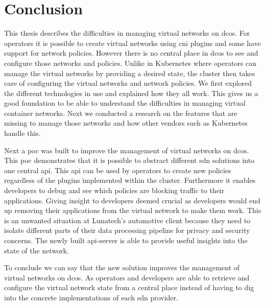 \chapter{Conclusion}
\label{chap:conclusions}
This thesis describes the difficulties in managing virtual networks on \gls{dcos}. For operators it is possible to create virtual networks using \gls{cni} plugins and some have support for network policies. However there is no central place in \gls{dcos} to see and configure those networks and policies. Unlike in Kubernetes where operators can manage the virtual networks by providing a desired state, the cluster then takes care of configuring the virtual networks and network policies. We first explored the different technologies in use and explained how they all work. This gives us a good foundation to be able to understand the difficulties in managing virtual container networks. Next we conducted a research on the features that are missing to manage those networks and how other vendors such as Kubernetes handle this.

Next a \gls{poc} was built to improve the management of virtual networks on \gls{dcos}. This \gls{poc} demonstrates that it is possible to abstract different \gls{sdn} solutions into one central \gls{api}. This \gls{api} can be used by operators to create new policies regardless of the plugins implemented within the cluster. Furthermore it enables developers to debug and see which policies are blocking traffic to their applications. Giving insight to developers deemed crucial as developers would end up removing their applications from the virtual network to make them work. This is an unwanted situation at Lunatech's automotive client because they need to isolate different parts of their data processing pipeline for privacy and security concerns. The newly built api-server is able to provide useful insights into the state of the network.

To conclude we can say that the new solution improves the management of virtual networks on \gls{dcos}. As operators and developers are able to retrieve and configure the virtual network state from a central place instead of having to dig into the concrete implementations of each \gls{sdn} provider.
